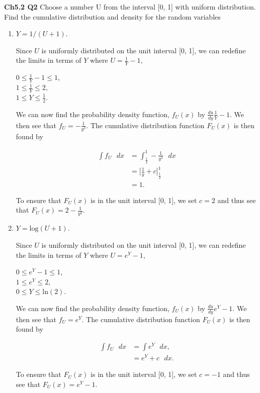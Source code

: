 \documentclass[12pt]{article}
\begin{document}

\noindent
\textbf{Ch5.2 Q2} Choose a number U from the interval [0, 1] with uniform distribution. Find the cumulative distribution and density for the random variables

\begin{enumerate}[label=(\alph*)]
\item $Y = 1/(U + 1)$.

\noindent
Since $U$ is uniformly distributed on the unit interval [0, 1], we can redefine the limits in terms of $Y$ where $U = \frac{1}{Y} - 1$, 

\begin{center}
$0 \leq \frac{1}{Y} - 1 \leq 1$, \\
$1 \leq  \frac{1}{Y} \leq 2$, \\
$1 \leq Y \leq \frac{1}{2}$. \\
\end{center}

\noindent
We can now find the probability density function, $f_U(x)$ by  $\frac{du}{dy} \frac{1}{Y} - 1$. We then see that $f_U = - \frac{1}{y^2}$. The cumulative distribution function $F_U(x)$ is then found by

\begin{align*}
\int f_U \text{ } dx & = \int_{\frac{1}{2}}^{1} - \frac{1}{y^2} \text{ } dx  \\
& = \Big [ \frac{1}{y} + c \Big ]_{\frac{1}{2}}^{1} \\
& = 1.
\end{align*}

\noindent
To ensure that $F_U(x)$ is in the unit interval [0, 1], we set $c = 2$ and thus see that $F_U(x) =  2 - \frac{1}{y^2}$.

\item $Y = \text{log}(U + 1)$.

\noindent
Since $U$ is uniformly distributed on the unit interval [0, 1], we can redefine the limits in terms of $Y$ where $U = e^{Y} - 1$, 

\begin{center}
$0 \leq e^{Y} - 1 \leq 1$, \\
$1 \leq  e^{Y}  \leq 2$, \\
$0 \leq Y \leq \text{ln}(2)$. \\
\end{center}

\noindent
We can now find the probability density function, $f_U(x)$ by  $\frac{du}{dy} e^{Y} - 1$. We then see that $f_U = e^{Y}$. The cumulative distribution function $F_U(x)$ is then found by

\begin{align*}
\int f_U \text{ } dx & = \int e^{Y} \text{ } dx,  \\
& = e^{Y} + c \text{ } dx.
\end{align*}

\noindent
To ensure that $F_U(x)$ is in the unit interval [0, 1], we set $c = -1$ and thus see that $F_U(x) = e^{Y} - 1$.

\end{enumerate}
\end{document}
